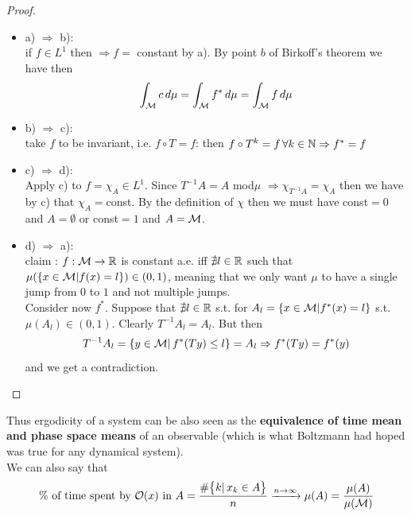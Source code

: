 \begin{proof}
\hfill
    \begin{itemize}
        \item a) $\Rightarrow$ b): \\
         if $f \in L^1$ then $\Rightarrow f= $ constant by a). By point $b$ of Birkoff's theorem we have then 
         \begin{equation*}
             \int_{\mathcal{M}} c \, d\mu =\int_{\mathcal{M}} f^* \, d\mu = \int_{\mathcal{M}} f \, d\mu
         \end{equation*}
         \item b) $\Rightarrow$ c): \\
         take $f$ to be invariant, i.e. $f \circ T = f$: then $f \circ T^k = f \, \forall k \in \mathbb{N} \Rightarrow f^* = f$
         \item c) $\Rightarrow$ d): \\
         Apply c) to $f = \chi_A \in L^1$. Since $T^{-1}A = A$ mod$\mu$ $\Rightarrow \chi_{T^{-1}A} = \chi_A$ then we have by c) that $\chi_A =$const. By the definition of $\chi$ then we must have const$=0$ and $A = \emptyset$ or const$=1$ and $A = \mathcal{M}$.
         \item d) $\Rightarrow$ a): \\
         claim : $f: \mathcal{M} \rightarrow \mathbb{R}$ is constant a.e. iff $\nexists l \in \mathbb{R}$ such that $\mu( \{ x \in \mathcal{M} | f(x) = l \} ) \in (0,1)$, meaning that we only want $\mu$ to have a single jump from $0$ to $1$ and not multiple jumps.
         \\Consider now $f^*$. Suppose that $\nexists l \in \mathbb{R}$ s.t. for $A_l = \{ x \in \mathcal{M} | f^*(x) = l \}$ s.t. $\mu (A_l) \in (0,1)$. Clearly $T^{-1}A_l = A_l$. But then 
         \begin{equation*}
             T^{-1}A_l = \{ y \in \mathcal{M} | \, f^* (Ty) \leq l \} = A_l \Rightarrow f^* (Ty) = f^*(y)
         \end{equation*}
         and we get a contradiction.
    \end{itemize}
\end{proof}
Thus ergodicity of a system can be also seen as the \textbf{equivalence of time mean and phase space means} of an observable (which is what Boltzmann had hoped was true for any dynamical system). 
\\We can also say that 
\begin{equation*}
     \text{$\%$ of time spent by $\mathcal{O}(x)$ in $A$} =  \frac{ \# \big\{ k | \, x_k \in A \big\}}{n} \xrightarrow{n \rightarrow \infty} \mu(A) = \frac{\mu(A)}{\mu(\mathcal{M})}  
\end{equation*}

